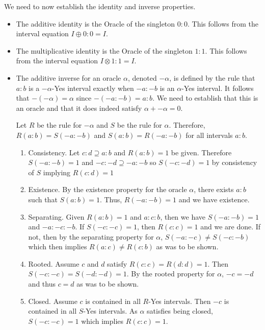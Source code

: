 \documentclass[12pt]{article}
\begin{document}
We need to now establish the identity and inverse properties. 

\begin{itemize}
    \item The additive identity is the Oracle of the singleton $0:0$. This follows from the interval equation $I \oplus 0:0 = I$.
    \item The multiplicative identity is the Oracle of the singleton $1:1$. This follows from the interval equation $I \otimes 1:1 = I$.
    \item The additive inverse for an oracle $\alpha$, denoted $-\alpha$, is defined by the rule that $a:b$ is a $-\alpha$-Yes interval exactly when $-a:-b$ is an $\alpha$-Yes interval.  It follows that $-(-\alpha) = \alpha$ since $-(-a:-b) = a:b$. We need to establish that this is an oracle and that it does indeed satisfy $\alpha + -\alpha = 0$. 
    
    Let $R$ be the rule for $-\alpha$ and $S$ be the rule for $\alpha$. Therefore, $R(a:b)=S(-a:-b)$ and $S(a:b) = R(-a:-b)$ for all intervals $a:b$.
    
    \begin{enumerate}
        \item Consistency. Let $c:d \supseteq a:b$ and $R(a:b)=1$ be given. Therefore $S(-a:-b) = 1$ and $-c:-d \supseteq -a:-b$ so $S(-c:-d)=1$ by consistency of $S$ implying $R(c:d) = 1$
        \item Existence. By the existence property for the oracle $\alpha$, there exists $a:b$ such that $S(a:b)=1$. Thus, $R(-a:-b)=1$ and we have existence. 
        \item Separating. Given $R(a:b)=1$ and $a:c:b$, then we have $S(-a:-b)=1$ and $-a:-c:-b$. If $S(-c:-c)=1$, then $R(c:c)=1$ and we are done. If not, then by the separating property for $\alpha$, $S(-a:-c) \neq S(-c:-b)$ which then implies $R(a:c)\neq R(c:b)$ as was to be shown. 
        \item Rooted. Assume $c$ and $d$ satisfy $R(c:c)=R(d:d)=1$. Then $S(-c:-c)=S(-d:-d)=1$. By the rooted property for $\alpha$, $-c = -d$ and thus $c=d$ as was to be shown. 
        \item Closed. Assume $c$ is contained in all $R$-Yes intervals. Then $-c$ is contained in all $S$-Yes intervals. As $\alpha$ satisfies being closed, $S(-c:-c)=1$ which implies $R(c:c)=1$.
    \end{enumerate}
    

\end{itemize}
\end{document}
